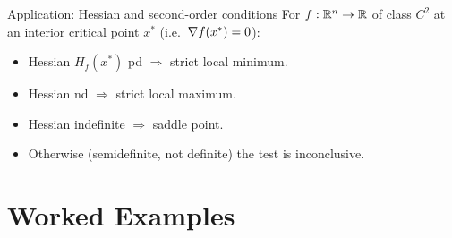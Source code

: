 \begin{rulebox}{Application: Hessian and second-order conditions}
For $f : \mathbb{R}^{n} \to \mathbb{R}$ of class $C^{2}$ at an interior critical point
$x^{*}$ (i.e.\ $\nabla f(x^{*}) = 0$):
\begin{itemize}[leftmargin=1.6em,itemsep=0.3ex]
    \item Hessian $H_{f}(x^{*})$ pd $\Rightarrow$ strict local minimum.
    \item Hessian nd $\Rightarrow$ strict local maximum.
    \item Hessian indefinite $\Rightarrow$ saddle point.
    \item Otherwise (semidefinite, not definite) the test is inconclusive.
\end{itemize}
\end{rulebox}

\section{Worked Examples}

